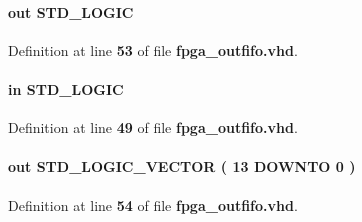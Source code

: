 \paragraph[{rdempty}]{ {\bfseries \textcolor{keywordflow}{out}\textcolor{vhdlchar}{ }} {\bfseries \textcolor{comment}{S\+T\+D\+\_\+\+L\+O\+G\+IC}\textcolor{vhdlchar}{ }} \hspace{0.3cm}{\ttfamily [Port]}}\label{classfpga__outfifo_afc6d6b8085df7af6f9c5d7dc39b1157c}


Definition at line {\bf 53} of file {\bf fpga\+\_\+outfifo.\+vhd}.

\paragraph[{rdreq}]{ {\bfseries \textcolor{keywordflow}{in}\textcolor{vhdlchar}{ }} {\bfseries \textcolor{comment}{S\+T\+D\+\_\+\+L\+O\+G\+IC}\textcolor{vhdlchar}{ }} \hspace{0.3cm}{\ttfamily [Port]}}\label{classfpga__outfifo_a5b72a180053ffc44309f7598bb6ad9e4}


Definition at line {\bf 49} of file {\bf fpga\+\_\+outfifo.\+vhd}.

\paragraph[{rdusedw}]{ {\bfseries \textcolor{keywordflow}{out}\textcolor{vhdlchar}{ }} {\bfseries \textcolor{comment}{S\+T\+D\+\_\+\+L\+O\+G\+I\+C\+\_\+\+V\+E\+C\+T\+OR}\textcolor{vhdlchar}{ }\textcolor{vhdlchar}{(}\textcolor{vhdlchar}{ }\textcolor{vhdlchar}{ } \textcolor{vhdldigit}{13} \textcolor{vhdlchar}{ }\textcolor{keywordflow}{D\+O\+W\+N\+TO}\textcolor{vhdlchar}{ }\textcolor{vhdlchar}{ } \textcolor{vhdldigit}{0} \textcolor{vhdlchar}{ }\textcolor{vhdlchar}{)}\textcolor{vhdlchar}{ }} \hspace{0.3cm}{\ttfamily [Port]}}\label{classfpga__outfifo_aed7f028b4e425b787cf3caeff9e15571}


Definition at line {\bf 54} of file {\bf fpga\+\_\+outfifo.\+vhd}.

